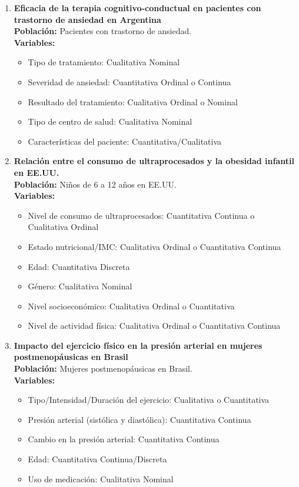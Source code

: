 \documentclass[12pt, letterpaper]{article}
\begin{document}
\begin{enumerate}
\item \textbf{Eficacia de la terapia cognitivo-conductual en pacientes con trastorno de ansiedad en Argentina} \\ 
\textbf{Población:} Pacientes con trastorno de ansiedad. \\ 
\textbf{Variables:}
\begin{itemize}
  \item Tipo de tratamiento: Cualitativa Nominal
  \item Severidad de ansiedad: Cuantitativa Ordinal o Continua
  \item Resultado del tratamiento: Cualitativa Ordinal o Nominal
  \item Tipo de centro de salud: Cualitativa Nominal
  \item Características del paciente: Cuantitativa/Cualitativa
\end{itemize}

\item \textbf{Relación entre el consumo de ultraprocesados y la obesidad infantil en EE.UU.} \\ 
\textbf{Población:} Niños de 6 a 12 años en EE.UU. \\ 
\textbf{Variables:}
\begin{itemize}
  \item Nivel de consumo de ultraprocesados: Cuantitativa Continua o Cualitativa Ordinal
  \item Estado nutricional/IMC: Cualitativa Ordinal o Cuantitativa Continua
  \item Edad: Cuantitativa Discreta
  \item Género: Cualitativa Nominal
  \item Nivel socioeconómico: Cualitativa Ordinal o Cuantitativa
  \item Nivel de actividad física: Cualitativa Ordinal o Cuantitativa Continua
\end{itemize}

\item \textbf{Impacto del ejercicio físico en la presión arterial en mujeres postmenopáusicas en Brasil} \\ 
\textbf{Población:} Mujeres postmenopáusicas en Brasil. \\ 
\textbf{Variables:}
\begin{itemize}
  \item Tipo/Intensidad/Duración del ejercicio: Cualitativa o Cuantitativa
  \item Presión arterial (sistólica y diastólica): Cuantitativa Continua
  \item Cambio en la presión arterial: Cuantitativa Continua
  \item Edad: Cuantitativa Continua/Discreta
  \item Uso de medicación: Cualitativa Nominal
\end{itemize}


\end{enumerate}
\end{document}
